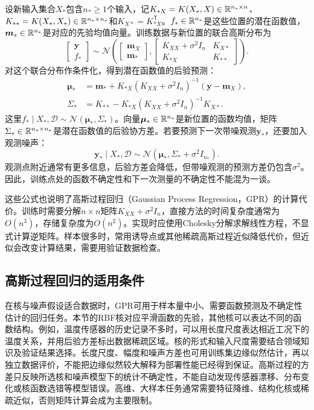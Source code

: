 设新输入集合$X_*$包含$n_*\geq1$个输入，记$K_{*X}=K(X_*,X)\in\mathbb{R}^{n_*\times n}$、$K_{**}=K(X_*,X_*)\in\mathbb{R}^{n_*\times n_*}$和$K_{X*}=K_{*X}^{\mathsf T}$。$f_*\in\mathbb{R}^{n_*}$是这些位置的潜在函数值，$\bm m_*\in\mathbb{R}^{n_*}$是对应的先验均值向量。训练数据与新位置的联合高斯分布为
\begin{equation}
 \begin{bmatrix}\bm y\\f_*\end{bmatrix}
 \sim\mathcal N\left(
 \begin{bmatrix}\bm m_X\\\bm m_*\end{bmatrix},
 \begin{bmatrix}
 K_{XX}+\sigma^2I_n&K_{X*}\\
 K_{*X}&K_{**}
 \end{bmatrix}\right).
 \label{eq:gp-joint}
\end{equation}
对这个联合分布作条件化，得到潜在函数值的后验预测：
\begin{align}
 \bm\mu_*&=\bm m_*+K_{*X}(K_{XX}+\sigma^2I_n)^{-1}(\bm y-\bm m_X),\\
 \Sigma_*&=K_{**}-K_{*X}(K_{XX}+\sigma^2I_n)^{-1}K_{X*}.
 \label{eq:gp-posterior}
\end{align}
这里$f_*\mid X_*,\mathcal D\sim\mathcal N(\bm\mu_*,\Sigma_*)$。向量$\bm\mu_*\in\mathbb{R}^{n_*}$是新位置的函数均值，矩阵$\Sigma_*\in\mathbb{R}^{n_*\times n_*}$是潜在函数值的后验协方差。若要预测下一次带噪观测$\bm y_*$，还要加入观测噪声：
\begin{equation}
 \bm y_*\mid X_*,\mathcal D\sim\mathcal N(\bm\mu_*,\Sigma_*+\sigma^2I_{n_*}).
 \label{eq:gp-predictive}
\end{equation}
观测点附近通常有更多信息，后验方差会降低，但带噪观测的预测方差仍包含$\sigma^2$。因此，训练点处的函数不确定性和下一次测量的不确定性不能混为一谈。

这些公式也说明了高斯过程回归（Gaussian Process Regression，GPR）的计算代价。训练时需要分解$n\times n$矩阵$K_{XX}+\sigma^2I_n$，直接方法的时间复杂度通常为$O(n^3)$，存储复杂度为$O(n^2)$。实现时应使用Cholesky分解求解线性方程，不显式计算逆矩阵。样本很多时，常用诱导点或其他稀疏高斯过程近似降低代价，但近似会改变计算结果，需要用验证数据检查。

\subsection{高斯过程回归的适用条件}
在核与噪声假设适合数据时，GPR可用于样本量中小、需要函数预测及不确定性估计的回归任务。本节的RBF核对应平滑函数的先验，其他核可以表达不同的函数结构。例如，温度传感器的历史记录不多时，可以用长度尺度表达相近工况下的温度关系，并用后验方差标出数据稀疏区域。核的形式和输入尺度需要结合领域知识及验证结果选择。长度尺度、幅度和噪声方差也可用训练集边缘似然估计，再以独立数据评价，不能把边缘似然较大解释为部署性能已经得到保证。高斯过程的方差只反映所选核和噪声模型下的统计不确定性，不能自动发现传感器漂移、分布变化或核函数选错等模型错误。高维、大样本任务通常需要特征降维、结构化核或稀疏近似，否则矩阵计算会成为主要限制。

